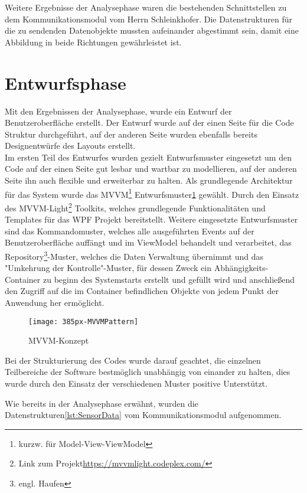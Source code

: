 Weitere Ergebnisse der Analysephase waren die bestehenden Schnittstellen zu dem Kommunikationsmodul vom Herrn Schleinkhofer. Die Datenstrukturen für die zu sendenden Datenobjekte mussten aufeinander abgestimmt sein, damit eine Abbildung in beide Richtungen gewährleistet ist. 


\section{Entwurfsphase}
Mit den Ergebnissen der Analysephase, wurde ein Entwurf der Benutzeroberfläche erstellt. Der Entwurf wurde auf der einen Seite für die Code Struktur durchgeführt, auf der anderen Seite wurden ebenfalls bereits Designentwürfe des Layouts erstellt.\\
Im ersten Teil des Entwurfes wurden gezielt Entwurfsmuster eingesetzt um den Code auf der einen Seite gut lesbar und wartbar zu modellieren, auf der anderen Seite ihn auch flexible und erweiterbar zu halten. Als grundlegende Architektur für das System wurde das MVVM\footnote{kurzw. für Model-View-ViewModel} Entwurfsmuster\ref{fig:mvvm} gewählt. Durch den Einsatz des MVVM-Light\footnote{Link zum Projekt\url{https://mvvmlight.codeplex.com/}} Toolkits, welches grundlegende Funktionalitäten und Templates für das WPF Projekt bereitstellt. Weitere eingesetzte Entwurfsmuster sind das Kommandomuster, welches alle ausgeführten Events auf der Benutzeroberfläche auffängt und im ViewModel behandelt und verarbeitet, das Repository\footnote{engl. Haufen}-Muster, welches die Daten Verwaltung übernimmt und das "Umkehrung der Kontrolle"-Muster, für dessen Zweck ein Abhängigkeits-Container zu beginn des Systemstarts erstellt und gefüllt wird und anschließend den Zugriff auf die im Container befindlichen Objekte von jedem Punkt der Anwendung her ermöglicht.\\

\begin{figure}[h]
	\centering
		\texttt{[image: 385px-MVVMPattern]}
		\caption{MVVM-Konzept}
		\label{fig:mvvm}
\end{figure}

Bei der Strukturierung des Codes wurde darauf geachtet, die einzelnen Teilbereiche der Software bestmöglich unabhängig von einander zu halten, dies wurde durch den Einsatz der verschiedenen Muster positive Unterstützt.

Wie bereits in der Analysephase erwähnt, wurden die Datenstrukturen\ref{lst:SensorData} vom Kommunikationsmodul aufgenommen.

